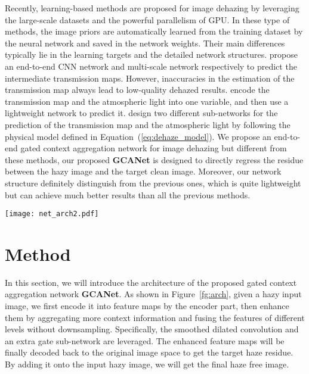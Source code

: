 \documentclass[10pt,twocolumn,letterpaper]{article}
\newcommand{\Eref}[1]{Equation~(\ref{#1})}
\newcommand{\Fref}[1]{Figure~\ref{#1}}
\begin{document}
Recently, learning-based methods are proposed for image dehazing by leveraging the large-scale datasets and the powerful parallelism of GPU. In these type of methods, the image priors are automatically learned from the training dataset by the neural network and saved in the network weights. Their main differences typically lie in the learning targets and the detailed network structures. \cite{cai2016dehazenet,ren2016single} propose an end-to-end CNN network and multi-scale network respectively to predict the intermediate transmission maps. However, inaccuracies in the estimation of the transmission map always lead to low-quality dehazed results. \cite{li2017aod} encode the transmission map and the atmospheric light into one variable, and then use a lightweight network to predict it. \cite{zhang2018densely} design two different sub-networks for the prediction of the transmission map and the atmospheric light by following the physical model defined in \Eref{eq:dehaze_model}. We propose an end-to-end gated context aggregation network for image dehazing but different from these methods, our proposed \textbf{GCANet} is designed to directly regress the residue between the hazy image and the target clean image. Moreover, our network structure definitely distinguish from the previous ones, which is quite lightweight but can achieve much better results than all the previous  methods.

\begin{figure*}[ht]
	\centering \texttt{[image: net\_arch2.pdf]}
\caption{The overall network structure of the proposed \textbf{GCANet}, which follows a basic auto-encoder structure. It consists of three convolution blocks as the encoder part, and one deconvolution block and two convolution blocks as the decoder part. Several smoothed dilated resblocks are inserted between them to aggregate context information without gridding artifacts. To fuse the features from different levels, an extra gate fusion sub-network is leveraged. During the runtime, the \textbf{GCANet} will predict the residue between the target clean image and the hazy input image in an end-to-end way. }
	\label{fg:arch}
\end{figure*}

\section{Method}
In this section, we will introduce the architecture of the proposed gated context aggregation network \textbf{GCANet}. As shown in \Fref{fg:arch}, given a hazy input image, we first encode it into feature maps by the encoder part, then enhance them by aggregating more context information and fusing the features of different levels  without downsampling. Specifically,  the smoothed dilated convolution and an extra gate sub-network are leveraged. The enhanced feature maps will be finally decoded back to the original image space to get the target haze residue. By adding it onto the input hazy image, we will get the final haze free image. 
\end{document}
